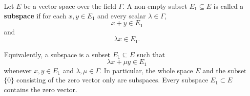 Let $E$ be a vector space over the field $\Gamma$. A non-empty subset $E_1 \subseteq E$ is called a \textbf{subspace} if for each $x, y \in E_1$ and every scalar $\lambda \in \Gamma$,
$$x + y \in E_1$$
and
$$\lambda x \in E_1.$$

Equivalently, a subspace is a subset $E_1 \subseteq E$ such that
$$\lambda x + \mu y \in E_1$$
whenever $x, y \in E_1$ and $\lambda, \mu \in \Gamma$. In particular, the whole space $E$ and the subset $\{0\}$ consisting of the zero vector only are subspaces. Every subspace $E_1 \subset E$ contains the zero vector.

